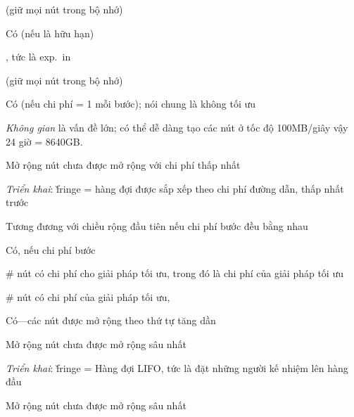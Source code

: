 \documentclass{article}
\begin{document}
\begin{huge}
  (giữ mọi nút trong bộ nhớ)



 Có (nếu  là hữu hạn)

 , tức là exp.~in 

  (giữ mọi nút trong bộ nhớ)

 Có (nếu chi phí = 1 mỗi bước); nói chung là không tối ưu

\emph{Không gian} là vấn đề lớn; có thể dễ dàng tạo các nút ở tốc độ 100MB/giây\nl
vậy 24 giờ = 8640GB.



Mở rộng nút chưa được mở rộng với chi phí thấp nhất

\emph{Triển khai}:\nl
\v{fringe} = hàng đợi được sắp xếp theo chi phí đường dẫn, thấp nhất trước

Tương đương với chiều rộng đầu tiên nếu chi phí bước đều bằng nhau

 Có, nếu chi phí bước \mat{$\geq \epsilon$}

 \# nút có  chi phí cho giải pháp tối ưu, \al
trong đó  là chi phí của giải pháp tối ưu

 \# nút có  chi phí của giải pháp tối ưu, 

 Có---các nút được mở rộng theo thứ tự tăng dần 



Mở rộng nút chưa được mở rộng sâu nhất

\emph{Triển khai}:\nl
\v{fringe} = Hàng đợi LIFO, tức là đặt những người kế nhiệm lên hàng đầu

\textwidth
{}



Mở rộng nút chưa được mở rộng sâu nhất


\end{huge}
\end{document}
